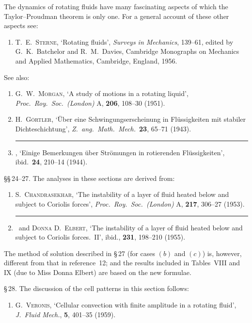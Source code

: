 The dynamics of rotating fluids have many fascinating aspects of which the
Taylor--Proudman theorem is only one.  For a general account of these other
aspects see:
\begin{enumerate}
\item[8.] T.\ E.\ \textsc{Sterne}, `Rotating fluids', \emph{Surveys in Mechanics}, 139--61, edited by
  G.\ K.\ Batchelor and R.\ M.\ Davies, Cambridge Monographs on Mechanics
  and Applied Mathematics, Cambridge, England, 1956.
\end{enumerate}

\noindent See also:
\begin{enumerate}
\item[9.] G.\ W.\ \textsc{Morgan}, `A study of motions in a rotating liquid', \emph{Proc.\ Roy.\ Soc.\
  (London)} A, \textbf{206}, 108--30 (1951).
\item[10.] H.\ \textsc{G\"ortler}, `\"Uber eine Schwingungserscheinung in Fl\"ussigkeiten mit
  stabiler Dichteschichtung', \emph{Z.\ ang.\ Math.\ Mech.}\ \textbf{23}, 65--71 (1943).
\item[11.] \rule{2em}{0.4pt}, `Einige Bemerkungen \"uber Str\"omungen in rotierenden Fl\"ussigkeiten',
  ibid.\ \textbf{24}, 210--14 (1944).
\end{enumerate}

\noindent \S\S\,24--27.  The analyses in these sections are derived from:
\begin{enumerate}
\item[12.] S.\ \textsc{Chandrasekhar}, `The instability of a layer of fluid heated below and
  subject to Coriolis forces', \emph{Proc.\ Roy.\ Soc.\ (London)} A, \textbf{217}, 306--27 (1953).
\item[13.] \rule{2em}{0.4pt}\ and \textsc{Donna} D.\ \textsc{Elbert}, `The instability of a layer of fluid heated
  below and subject to Coriolis forces.\ II', ibid., \textbf{231}, 198--210 (1955).
\end{enumerate}

\noindent The method of solution described in \S\,27 (for cases $(b)$ and $(c)$) is, however, different
from that in reference~12; and the results included in Tables~VIII and IX (due
to Miss Donna Elbert) are based on the new formulae.

\noindent \S\,28.  The discussion of the cell patterns in this section follows:
\begin{enumerate}
\item[14.] G.\ \textsc{Veronis}, `Cellular convection with finite amplitude in a rotating fluid',
  \emph{J.\ Fluid Mech.}, \textbf{5}, 401--35 (1959).
\end{enumerate}

